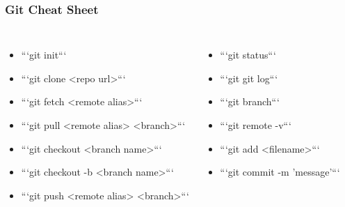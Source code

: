 \documentclass[unknownkeysallowed]{beamer}
\begin{document}
\begin{frame}
\frametitle{Git Cheat Sheet}
\begin{columns}
    \column{2.75in}
        \begin{itemize}
            \item{```git init```}
            \item{```git clone <repo url>```}
            \item{```git fetch <remote alias>```}
            \item{```git pull <remote alias> <branch>```}
            \item{```git checkout <branch name>```}
            \item{```git checkout -b <branch name>```}
            \item{```git push <remote alias> <branch>```}

        \end{itemize}
    \column{2.0in}
        \begin{itemize}
            \item{```git status```}
            \item{```git git log```}
            \item{```git branch```}
            \item{```git remote -v```}
            \item{```git add <filename>```}
            \item{```git commit -m 'message'```}
        \end{itemize}
    \end{columns}
    \vspace{1cm} %
\end{frame}
\end{document}
